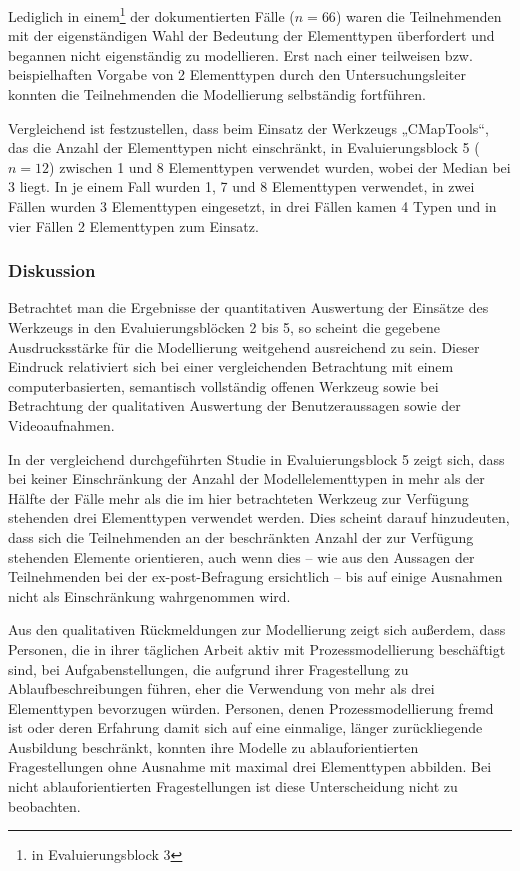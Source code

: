 Lediglich in einem\footnote{in Evaluierungsblock 3} der dokumentierten Fälle ($n=66$) waren die Teilnehmenden mit der eigenständigen Wahl der Bedeutung der Elementtypen überfordert und begannen nicht eigenständig zu modellieren. Erst nach einer teilweisen bzw. beispielhaften Vorgabe von 2 Elementtypen durch den Untersuchungsleiter konnten die Teilnehmenden die Modellierung selbständig fortführen. 

Vergleichend ist festzustellen, dass beim Einsatz der Werkzeugs „CMapTools“, das die Anzahl der Elementtypen nicht einschränkt, in Evaluierungsblock 5 ($n=12$) zwischen 1 und 8 Elementtypen verwendet wurden, wobei der Median bei 3 liegt. In je einem Fall wurden 1, 7 und 8 Elementtypen verwendet, in zwei Fällen wurden 3 Elementtypen eingesetzt, in drei Fällen kamen 4 Typen und in vier Fällen 2 Elementtypen zum Einsatz.

\subsubsection{Diskussion} %

Betrachtet man die Ergebnisse der quantitativen Auswertung der Einsätze des Werkzeugs in den Evaluierungsblöcken 2 bis 5, so scheint die gegebene Ausdrucksstärke für die Modellierung weitgehend ausreichend zu sein. Dieser Eindruck relativiert sich bei einer vergleichenden Betrachtung mit einem computerbasierten, semantisch vollständig offenen Werkzeug sowie bei Betrachtung der qualitativen Auswertung der Benutzeraussagen sowie der Videoaufnahmen. 

In der vergleichend durchgeführten Studie in Evaluierungsblock 5 zeigt sich, dass bei keiner Einschränkung der Anzahl der Modellelementtypen in mehr als der Hälfte der Fälle mehr als die im hier betrachteten Werkzeug zur Verfügung stehenden drei Elementtypen verwendet werden. Dies scheint darauf hinzudeuten, dass sich die Teilnehmenden an der beschränkten Anzahl der zur Verfügung stehenden Elemente orientieren, auch wenn dies -- wie aus den Aussagen der Teilnehmenden bei der ex-post-Befragung ersichtlich -- bis auf einige Ausnahmen nicht als Einschränkung wahrgenommen wird.

Aus den qualitativen Rückmeldungen zur Modellierung zeigt sich außerdem, dass Personen, die in ihrer täglichen Arbeit aktiv mit Prozessmodellierung beschäftigt sind, bei Aufgabenstellungen, die aufgrund ihrer Fragestellung zu Ablaufbeschreibungen führen, eher die Verwendung von mehr als drei Elementtypen bevorzugen würden. Personen, denen Prozessmodellierung fremd ist oder deren Erfahrung damit sich auf eine einmalige, länger zurückliegende Ausbildung beschränkt, konnten ihre Modelle zu ablauforientierten Fragestellungen ohne Ausnahme mit maximal drei Elementtypen abbilden. Bei nicht ablauforientierten Fragestellungen ist diese Unterscheidung nicht zu beobachten.


